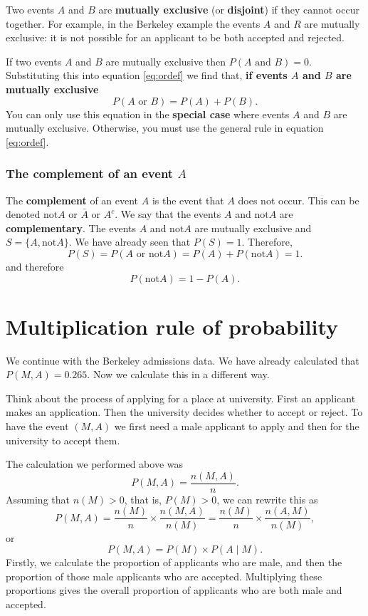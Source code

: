 \documentclass[
  british,
  11pt,
  openany, a4paper]{book}
\begin{document}
Two events \(A\) and \(B\) are \textbf{mutually exclusive} (or \textbf{disjoint}) if they cannot occur together. For example, in the Berkeley example the events \(A\) and \(R\) are mutually exclusive: it is not possible for an applicant to be both accepted and rejected.

If two events \(A\) and \(B\) are mutually exclusive then \(P(A \text{ and } B)=0\). Substituting this into equation \eqref{eq:ordef} we find that, \textbf{if events \(A\) and \(B\) are mutually exclusive}
\begin{equation}
P(A \text{ or } B) = P(A) + P(B). 
\label{eq:mut}
\end{equation}
You can only use this equation in the \textbf{special case} where events \(A\) and \(B\) are mutually exclusive. Otherwise, you must use the general rule in equation \eqref{eq:ordef}.

\subsubsection*{\texorpdfstring{The complement of an event \(A\)}{The complement of an event A}}\label{the-complement-of-an-event-a}

The \textbf{complement} of an event \(A\) is the event that \(A\) does not occur. This can be denoted \(\text{not}A\) or \(\bar{A}\) or \(A^c\). We say that the events \(A\) and \(\text{not}A\) are \textbf{complementary}. The events \(A\) and \(\text{not}A\) are mutually exclusive and \(S=\{A, \text{not}A\}\). We have already seen that \(P(S) = 1\). Therefore,
\[ P(S)=P(A \text{ or } \text{not}A) = P(A) + P(\text{not}A) = 1. \]
and therefore
\[ P(\text{not}A) = 1 - P(A). \]

\section{Multiplication rule of probability}\label{multrule}

We continue with the Berkeley admissions data. We have already calculated that \(P(M , A)=0.265\). Now we calculate this in a different way.

Think about the process of applying for a place at university. First an applicant makes an application. Then the university decides whether to accept or reject. To have the event \((M, A)\) we first need a male applicant to apply and then for the university to accept them.

The calculation we performed above was
\[ P(M , A) = \frac{n(M , A)}{n}. \]
Assuming that \(n(M)>0\), that is, \(P(M)>0\), we can rewrite this as
\[ P(M , A) = \frac{n(M)}{n} \times \frac{n(M , A)}{n(M)} = \frac{n(M)}{n} \times \frac{n(A , M)}{n(M)}, \]
or
\[ P(M , A) = P(M) \times P(A \mid M). \]
Firstly, we calculate the proportion of applicants who are male, and then the proportion of those male applicants who are accepted. Multiplying these proportions gives the overall proportion of applicants who are both male and accepted.
\end{document}

